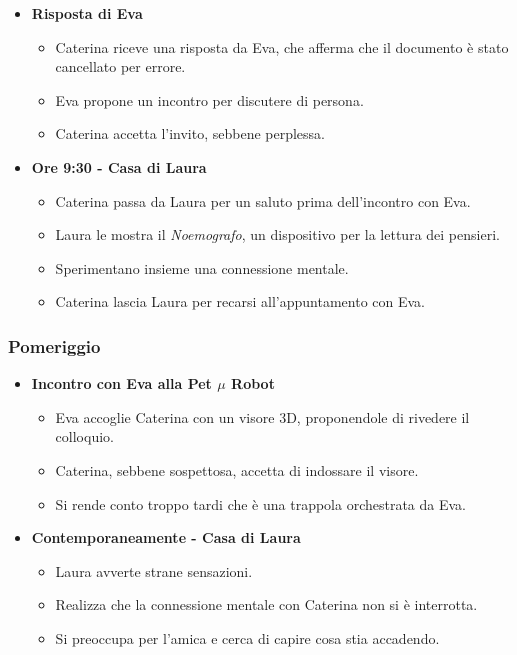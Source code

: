 \begin{itemize}
    \item \textbf{Risposta di Eva}
    \begin{itemize}
        \item Caterina riceve una risposta da Eva, che afferma che il documento è stato cancellato per errore.
        \item Eva propone un incontro per discutere di persona.
        \item Caterina accetta l'invito, sebbene perplessa.
    \end{itemize}
    \item \textbf{Ore 9:30 - Casa di Laura}
    \begin{itemize}
        \item Caterina passa da Laura per un saluto prima dell'incontro con Eva.
        \item Laura le mostra il \emph{Noemografo}, un dispositivo per la lettura dei pensieri.
        \item Sperimentano insieme una connessione mentale.
        \item Caterina lascia Laura per recarsi all'appuntamento con Eva.
    \end{itemize}
\end{itemize}

\subsubsection*{Pomeriggio}

\begin{itemize}
    \item \textbf{Incontro con Eva alla Pet $\mu$ Robot}
    \begin{itemize}
        \item Eva accoglie Caterina con un visore 3D, proponendole di rivedere il colloquio.
        \item Caterina, sebbene sospettosa, accetta di indossare il visore.
        \item Si rende conto troppo tardi che è una trappola orchestrata da Eva.
    \end{itemize}
    \item \textbf{Contemporaneamente - Casa di Laura}
    \begin{itemize}
        \item Laura avverte strane sensazioni.
        \item Realizza che la connessione mentale con Caterina non si è interrotta.
        \item Si preoccupa per l'amica e cerca di capire cosa stia accadendo.
    \end{itemize}
\end{itemize}

